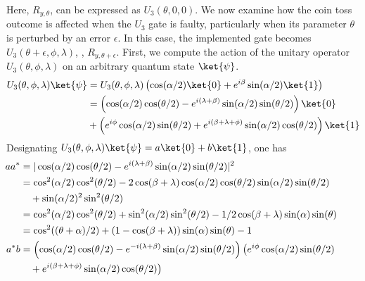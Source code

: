 \begin{example} 
Here, \( R_{y,\theta} \), can be expressed as \( U_3(\theta, 0, 0) \). We now examine how the coin toss outcome is affected when the \( U_3 \) gate is faulty, particularly when its parameter \( \theta \) is perturbed by an error \( \epsilon \). In this case, the implemented gate becomes \( U_3(\theta + \epsilon, \phi, \lambda) \), \ie, $R_{y,\theta+\epsilon}$.
First, we compute the action of the unitary operator \( U_3(\theta, \phi, \lambda) \) on an arbitrary quantum state \( \ket{\psi} \).
\begin{align*}
  U_3(\theta, \phi, \lambda) \ket{\psi} 
  & = U_3(\theta, \phi, \lambda) \left(\cos(\alpha/2) \ket{0} + e^{i\beta}\sin(\alpha/2) \ket{1} \right)\\
  & = \left(\cos(\alpha/2) \cos(\theta/2) - e^{i (\lambda + \beta)}  \sin(\alpha/2)\sin(\theta/2) \right) \ket{0} \\
  & + \left(e^{i \phi}\cos(\alpha/2)\sin(\theta/2) + e^{i (\beta + \lambda + \phi)} \sin(\alpha/2) \cos(\theta/2 ) \right) \ket{1}
\end{align*}
Designating $U_3(\theta, \phi, \lambda) \ket{\psi} = a \ket{0} + b \ket{1}$, one has
\begin{align*}
  \hspace{-25pt} a a^* &= \vert \cos(\alpha/2) \cos(\theta/2) - e^{i (\lambda + \beta) }  \sin(\alpha/2)\sin(\theta/2) \vert ^2 \\
  \hspace{-25pt} & = \cos^2(\alpha/2) \cos^2(\theta/2) - 2 \cos(\beta + \lambda) \cos(\alpha/2) \cos(\theta/2)  \sin(\alpha/2)\sin(\theta/2)  \\
  \hspace{-25pt} & \hspace{10pt} + \sin(\alpha/2)^2 \sin^2(\theta/2) \\
  \hspace{-25pt} & = \cos^2(\alpha/2) \cos^2(\theta/2) + \sin^2(\alpha/2) \sin^2(\theta/2)  - 1/2 \cos(\beta + \lambda) \sin(\alpha)\sin(\theta) \\
  \hspace{-25pt} & = \cos^2((\theta+\alpha)/2)+(1-\cos(\beta + \lambda))\sin(\alpha)\sin(\theta) -1 \\
  \hspace{-25pt} a^*b & = \left(\cos(\alpha/2) \cos(\theta/2) - e^{-i (\lambda + \beta)}  \sin(\alpha/2)\sin(\theta/2) \right) \big(e^{i \phi}\cos(\alpha/2)\sin(\theta/2) \\
  \hspace{-25pt} & \hspace{10pt}  + e^{i (\beta + \lambda + \phi)} \sin(\alpha/2) \cos(\theta/2 ) \big) \\

\end{align*}
\end{example}
